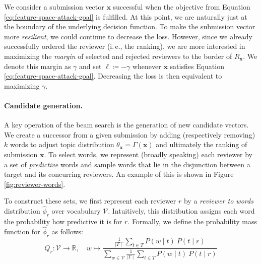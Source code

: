 \documentclass[letterpaper,twocolumn,10pt]{article}
\newcommand{\ie}{i.\,e.}
\newcommand{\bow}{\textbf{x}}
\newcommand{\vocabulary}{\mathcal{V}}
\newcommand{\submission}{\bow}
\newcommand{\reviewersubset}{R}
\newcommand{\reviewer}{r}
\newcommand{\reviewerwordsmass}{Q}
\newcommand{\reviewerwords}{\hat{\topicworddist}}
\newcommand{\topic}{t}
\newcommand{\topics}{T}
\newcommand{\stepsize}{k}
\newcommand{\loss}{\ell}
\newcommand{\topicextractor}{\Gamma}
\newcommand{\topicworddist}{\phi}
\newcommand{\topicdocumentdist}{\theta}
\newcommand{\word}{w}
\newcommand{\prob}{P}
\newcommand{\margin}{\gamma}
\begin{document}
We consider a submission vector $\submission$ successful when the objective from Equation \ref{eq:feature-space-attack-goal} is fulfilled. At this point, we are naturally just at the boundary of the underlying decision function. To make the submission vector more \emph{resilient}, we could continue to decrease the loss. However, since we already successfully ordered the reviewer (\ie{}, the ranking), we are more interested in maximizing the \emph{margin} of selected and rejected reviewers to the border of $\reviewersubset_\submission$. We denote this margin as $\margin$ and set $\loss \coloneqq -\margin$ whenever $\submission$ satisfies Equation \ref{eq:feature-space-attack-goal}. Decreasing the loss is then equivalent to maximizing $\margin$. 

\paragraph{Candidate generation.}

A key operation of the beam search is the generation of new candidate vectors. We create a successor from a given submission by adding (respectively removing) $\stepsize$ words to adjust topic distribution $\topicdocumentdist_\submission = \topicextractor(\submission)$ and ultimately the ranking of submission $\submission$.
To select words, we represent (broadly speaking) each reviewer by a set of \emph{predictive} words and sample words that lie in the disjunction between a target and its concurring reviewers. An example of this is shown in Figure \ref{fig:reviewer-words}.

To construct these sets, we first represent each reviewer $\reviewer$ by a  \emph{reviewer to words} distribution $\reviewerwords_\reviewer$ over vocabulary $\vocabulary$. 
Intuitively, this distribution assigns each word the probability how predictive it is for $\reviewer$. Formally, we define the probability mass function for $\reviewerwords_\reviewer$ as follows:
\begin{equation*}
\label{eq:reviewerwords}
   \reviewerwordsmass_\reviewer \colon \vocabulary \rightarrow \mathbb{R}, \quad 
   \word \mapsto 
   \frac
   {\frac{1}{\mid\topics\mid} \sum_{\topic \in \topics}{\prob(\word \mid \topic)\ \prob(\topic \mid \reviewer)}}
   {\sum_{\word\in\vocabulary}{\frac{1}{\mid\topics\mid} \sum_{\topic \in \topics}{\prob(\word \mid \topic)\ \prob(\topic \mid \reviewer)}}}
\end{equation*}
\end{document}
